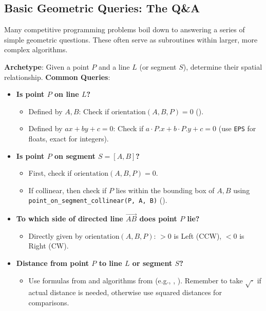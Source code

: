 \subsection{Basic Geometric Queries: The Q\&A}
\label{ssec:A.4.1}

Many competitive programming problems boil down to answering a series of simple geometric questions. These often serve as subroutines within larger, more complex algorithms.

\begin{pattern}
\label{pattern:A.4.1.point_line_rel}
\textbf{Archetype}: Given a point $P$ and a line $L$ (or segment $S$), determine their spatial relationship.
\textbf{Common Queries}:
\begin{itemize}
    \item \textbf{Is point $P$ on line $L$?}
        \begin{itemize}
            \item Defined by $A, B$: Check if $\text{orientation}(A, B, P) = 0$ ().
            \item Defined by $ax+by+c=0$: Check if $a \cdot P.x + b \cdot P.y + c = 0$ (use \texttt{EPS} for floats, exact for integers).
        \end{itemize}
    \item \textbf{Is point $P$ on segment $S=[A,B]$?}
        \begin{itemize}
            \item First, check if $\text{orientation}(A, B, P) = 0$.
            \item If collinear, then check if $P$ lies within the bounding box of $A,B$ using \texttt{point\_on\_segment\_collinear(P, A, B)} ().
        \end{itemize}
    \item \textbf{To which side of directed line $\vec{AB}$ does point $P$ lie?}
        \begin{itemize}
            \item Directly given by $\text{orientation}(A, B, P)$: $>0$ is Left (CCW), $<0$ is Right (CW).
        \end{itemize}
    \item \textbf{Distance from point $P$ to line $L$ or segment $S$?}
        \begin{itemize}
            \item Use formulas from  and algorithms from  (e.g., , ). Remember to take $\sqrt{\cdot}$ if actual distance is needed, otherwise use squared distances for comparisons.

\end{itemize}
\end{itemize}
\end{pattern}
